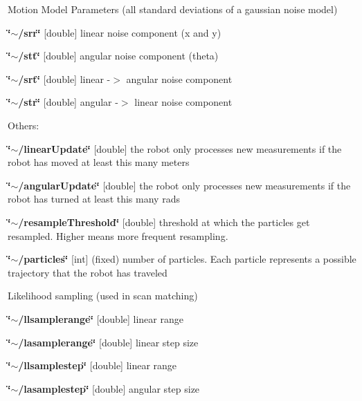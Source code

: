 Motion Model Parameters (all standard deviations of a gaussian noise model)
\begin{DoxyItemize}
\item {\bfseries \char`\"{}$\sim$/srr\char`\"{}} {\bfseries }\mbox{[}double\mbox{]} linear noise component (x and y)
\item {\bfseries \char`\"{}$\sim$/stt\char`\"{}} {\bfseries }\mbox{[}double\mbox{]} angular noise component (theta)
\item {\bfseries \char`\"{}$\sim$/srt\char`\"{}} {\bfseries }\mbox{[}double\mbox{]} linear -\/$>$ angular noise component
\item {\bfseries \char`\"{}$\sim$/str\char`\"{}} {\bfseries }\mbox{[}double\mbox{]} angular -\/$>$ linear noise component
\end{DoxyItemize}

Others\+:
\begin{DoxyItemize}
\item {\bfseries \char`\"{}$\sim$/linear\+Update\char`\"{}} {\bfseries }\mbox{[}double\mbox{]} the robot only processes new measurements if the robot has moved at least this many meters
\item {\bfseries \char`\"{}$\sim$/angular\+Update\char`\"{}} {\bfseries }\mbox{[}double\mbox{]} the robot only processes new measurements if the robot has turned at least this many rads
\item {\bfseries \char`\"{}$\sim$/resample\+Threshold\char`\"{}} {\bfseries }\mbox{[}double\mbox{]} threshold at which the particles get resampled. Higher means more frequent resampling.
\item {\bfseries \char`\"{}$\sim$/particles\char`\"{}} {\bfseries }\mbox{[}int\mbox{]} (fixed) number of particles. Each particle represents a possible trajectory that the robot has traveled
\end{DoxyItemize}

Likelihood sampling (used in scan matching)
\begin{DoxyItemize}
\item {\bfseries \char`\"{}$\sim$/llsamplerange\char`\"{}} {\bfseries }\mbox{[}double\mbox{]} linear range
\item {\bfseries \char`\"{}$\sim$/lasamplerange\char`\"{}} {\bfseries }\mbox{[}double\mbox{]} linear step size
\item {\bfseries \char`\"{}$\sim$/llsamplestep\char`\"{}} {\bfseries }\mbox{[}double\mbox{]} linear range
\item {\bfseries \char`\"{}$\sim$/lasamplestep\char`\"{}} {\bfseries }\mbox{[}double\mbox{]} angular step size
\end{DoxyItemize}

